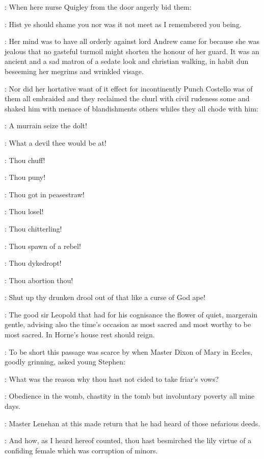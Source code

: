 : When here nurse Quigley from the door angerly bid them:

\nursequigley: Hist ye should shame you nor was it not meet as
I remembered you being.

: Her mind was to have all orderly against lord
Andrew came for because she was jealous that no gasteful turmoil might
shorten the honour of her guard.
It was an ancient and a sad matron of a sedate look and christian walking,
in habit dun beseeming her megrims and wrinkled visage.

: Nor did her hortative want of it effect for
incontinently Punch Costello was of them all embraided and they reclaimed
the churl with civil rudeness some and shaked him with menace of
blandishments others whiles they all chode with him:

\lynch: A murrain seize the dolt!

\madden: What a devil thee would be at!

\crotthers: Thou chuff!

\dixon: Thou puny!

\lenehan: Thou got in peasestraw!

\lynch: Thou losel!

\madden: Thou chitterling!

\crotthers: Thou spawn of a rebel!

\lenehan: Thou dykedropt!

\dixon: Thou abortion thou!

\stephen: Shut up thy drunken drool out of that like a curse of God ape!

: The good sir Leopold that had for his cognisance
the flower of quiet, margerain gentle, advising also the time's occasion
as most sacred and most worthy to be most sacred. In Horne's house rest
should reign.



: To be short this passage was scarce by when Master Dixon of Mary in
Eccles, goodly grinning, asked young Stephen:

\dixon: What was the reason why thou hast not cided to take friar's vows?

\stephen: Obedience in the womb, chastity in the tomb
but involuntary poverty all mine days.

: Master Lenehan at this made return that he had heard of
those nefarious deeds.

\lenehan: And how, as I heard hereof counted, thou hast besmirched the lily
virtue of a confiding female which was corruption of minors.

